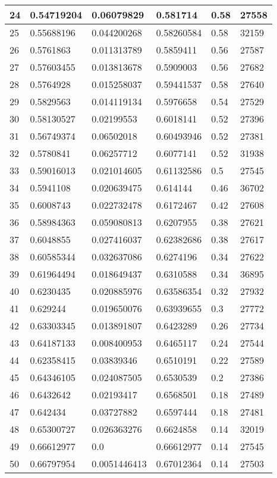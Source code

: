 \begin{longtable}{|l|l|l|l|l|l|}
24 & 0.54719204 & 0.06079829 & 0.581714 & 0.58 & 27558 \\ \hline 
25 & 0.55688196 & 0.044200268 & 0.58260584 & 0.58 & 32159 \\ \hline 
26 & 0.5761863 & 0.011313789 & 0.5859411 & 0.56 & 27587 \\ \hline 
27 & 0.57603455 & 0.013813678 & 0.5909003 & 0.56 & 27682 \\ \hline 
28 & 0.5764928 & 0.015258037 & 0.59441537 & 0.58 & 27640 \\ \hline 
29 & 0.5829563 & 0.014119134 & 0.5976658 & 0.54 & 27529 \\ \hline 
30 & 0.58130527 & 0.02199553 & 0.6018141 & 0.52 & 27396 \\ \hline 
31 & 0.56749374 & 0.06502018 & 0.60493946 & 0.52 & 27381 \\ \hline 
32 & 0.5780841 & 0.06257712 & 0.6077141 & 0.52 & 31938 \\ \hline 
33 & 0.59016013 & 0.021014605 & 0.61132586 & 0.5 & 27545 \\ \hline 
34 & 0.5941108 & 0.020639475 & 0.614144 & 0.46 & 36702 \\ \hline 
35 & 0.6008743 & 0.022732478 & 0.6172467 & 0.42 & 27608 \\ \hline 
36 & 0.58984363 & 0.059080813 & 0.6207955 & 0.38 & 27621 \\ \hline 
37 & 0.6048855 & 0.027416037 & 0.62382686 & 0.38 & 27617 \\ \hline 
38 & 0.60585344 & 0.032637086 & 0.6274196 & 0.34 & 27622 \\ \hline 
39 & 0.61964494 & 0.018649437 & 0.6310588 & 0.34 & 36895 \\ \hline 
40 & 0.6230435 & 0.020885976 & 0.63586354 & 0.32 & 27932 \\ \hline 
41 & 0.629244 & 0.019650076 & 0.63939655 & 0.3 & 27772 \\ \hline 
42 & 0.63303345 & 0.013891807 & 0.6423289 & 0.26 & 27734 \\ \hline 
43 & 0.64187133 & 0.008400953 & 0.6465117 & 0.24 & 27544 \\ \hline 
44 & 0.62358415 & 0.03839346 & 0.6510191 & 0.22 & 27589 \\ \hline 
45 & 0.64346105 & 0.024087505 & 0.6530539 & 0.2 & 27386 \\ \hline 
46 & 0.6432642 & 0.02193417 & 0.6568501 & 0.18 & 27489 \\ \hline 
47 & 0.642434 & 0.03727882 & 0.6597444 & 0.18 & 27481 \\ \hline 
48 & 0.65300727 & 0.026363276 & 0.6624858 & 0.14 & 32019 \\ \hline 
49 & 0.66612977 & 0.0 & 0.66612977 & 0.14 & 27545 \\ \hline 
50 & 0.66797954 & 0.0051446413 & 0.67012364 & 0.14 & 27503 \\ \hline 
\end{longtable}
